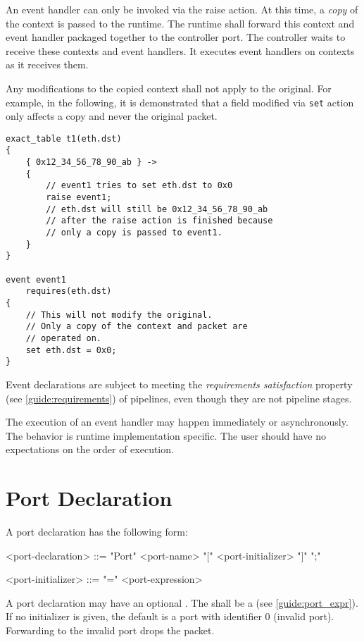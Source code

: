 An event handler can only be invoked via the raise action. At this time, a \textit{copy} of the context is passed to the runtime. The runtime shall forward this context and event handler packaged together to the controller port. The controller waits to receive these contexts and event handlers. It executes event handlers on contexts as it receives them.

Any modifications to the copied context shall not apply to the original. For example, in the following, it is demonstrated that a field modified via \texttt{set} action only affects a copy and never the original packet.

\begin{minip}
\begin{lstlisting}
exact_table t1(eth.dst)
{
	{ 0x12_34_56_78_90_ab } ->
	{
		// event1 tries to set eth.dst to 0x0
		raise event1;
		// eth.dst will still be 0x12_34_56_78_90_ab
		// after the raise action is finished because
		// only a copy is passed to event1.
	}
}

event event1
	requires(eth.dst)
{
	// This will not modify the original.
	// Only a copy of the context and packet are
	// operated on.
	set eth.dst = 0x0;
}
\end{lstlisting}
\end{minip}

Event declarations are subject to meeting the \textit{requirements satisfaction} property (see \ref{guide:requirements}) of pipelines, even though they are not pipeline stages.

The execution of an event handler may happen immediately or asynchronously. The behavior is runtime implementation specific. The user should have no expectations on the order of execution. 

\section{Port Declaration} \label{guide:port}

A port declaration has the following form:

\begin{minip}
\begin{grammar}
<port-declaration> ::=
"Port" <port-name> "[" <port-initializer> "]" ";"

<port-initializer> ::= "=" <port-expression>
\end{grammar}
\end{minip}

A port declaration may have an optional . The  shall be a  (see \ref{guide:port_expr}). If no initializer is given, the default is a port with identifier 0 (invalid port). Forwarding to the invalid port drops the packet.


